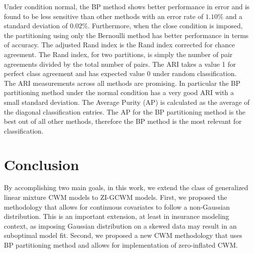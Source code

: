 \documentclass[12pt,letterpaper]{article}
\numberwithin{equation}{section}
\numberwithin{equation}{section}
\numberwithin{equation}{section}
\begin{document}
 Under condition normal, the BP method shows better performance in error and is found to be less sensitive than other methods with an error rate of $ 1.10 \% $ and a standard deviation of $ 0.02 \% $.  Furthermore, when the close condition is imposed, the partitioning using only the Bernoulli method has better performance in terms of accuracy. The adjusted Rand index \citep[ARI][]{hubert85} is the Rand index \citep{rand71} corrected for chance agreement. The Rand index, for two partitions, is simply the number of pair agreements divided by the total number of pairs. The ARI takes a value 1 for perfect class agreement and has expected value 0 under random classification.
 The ARI measurements across all methods are promising. In particular the BP partitioning method under the normal condition has a very good ARI with a small standard deviation. The Average Purity (AP) is calculated as the average of the diagonal classification entries. 
The AP for the BP partitioning method is the best out of all other methods, therefore the BP method is the most relevant for classification.

\section{Conclusion}

By accomplishing two main goals, in this work, we extend the class of generalized linear mixture CWM models to ZI-GCWM models. First, we proposed the methodology that allows for continuous covariates to follow a non-Gaussian distribution. This is an important extension, at least in insurance modeling context, as imposing Gaussian distribution on a skewed data may result in an suboptimal model fit. Second, we proposed a new CWM methodology that uses BP partitioning method and allows for implementation of zero-inflated CWM. 

\end{document}
